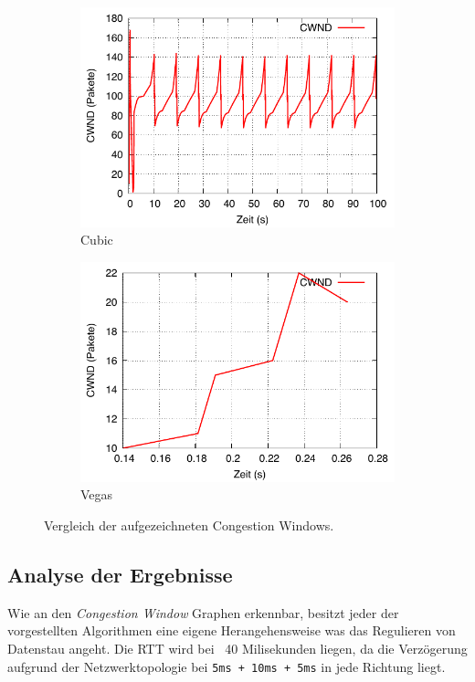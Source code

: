\documentclass[paper=a4,fontsize=12pt,ngerman]{scrartcl}
\begin{document}
\begin{figure}[H]
\begin{subfigure}{0.40\textwidth}
        \includegraphics[width=\linewidth]{graphics/cubicCW.pdf}
        \caption{Cubic}
        \label{fig:cubic}
    \end{subfigure}
    \hfill
    \begin{subfigure}{0.40\textwidth}
        \includegraphics[width=\linewidth]{graphics/vegasCW.pdf}
        \caption{Vegas}
        \label{fig:vegas}
    \end{subfigure}

    \caption{Vergleich der aufgezeichneten Congestion Windows.}
    \label{fig:cwnd-all}
\end{figure}

\clearpage 
\subsection{Analyse der Ergebnisse}
Wie an den \textit{Congestion Window} Graphen erkennbar, besitzt jeder 
der vorgestellten Algorithmen eine eigene Herangehensweise was  das Regulieren 
von Datenstau angeht.
Die RTT wird bei ~40 Milisekunden liegen, da die Verzögerung aufgrund
der Netzwerktopologie bei \texttt{5ms + 10ms + 5ms} in jede Richtung liegt. 
\end{document}
